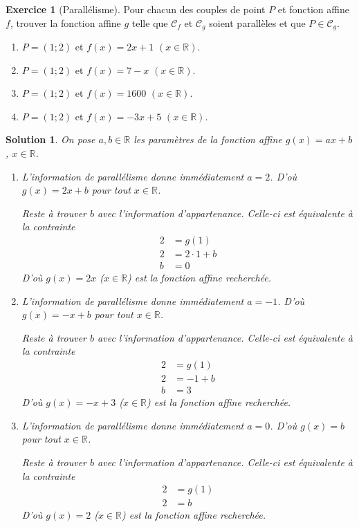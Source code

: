 \documentclass[12pt]{paper}
\theoremstyle{plain}
\newtheorem*{sol}{Solution}
\theoremstyle{definition}
\newtheorem{ex}{Exercice}
\newcommand{\C}{\mathcal{C}}
\newcommand{\R}{\mathbb{R}}
\newcommand{\exe}[2]{
		\begin{ex} #1  \end{ex}
		\begin{sol} #2 \end{sol}
	}
\newcommand{\exe}[2]{
		\begin{ex} #1  \end{ex}
	}
\begin{document}
\exe{[Parallélisme]
	Pour chacun des couples de point $P$ et fonction affine $f$, trouver la fonction affine $g$ telle que $\C_f$ et $\C_g$ soient parallèles et que $P \in \C_g$.
	
	
	\begin{multicols}{2}
	\begin{enumerate}
		\item $P=(1;2)$ et $f(x) = 2x+1$ $(x\in\R)$.
		\item $P=(1;2)$ et $f(x) = 7-x$ $(x\in\R)$.
		\item $P=(1;2)$ et $f(x) = 1600$ $(x\in\R)$.
		\item $P=(1;2)$ et $f(x) = -3x + 5$ $(x\in\R)$.
	\end{enumerate}
	\end{multicols}
}{
	On pose $a,b\in\R$ les paramètres de la fonction affine $g(x)=ax+b$, $x\in\R$.
	\begin{enumerate}
		\item 
			L'information de parallélisme donne immédiatement $a=2$.
			D'où $g(x) = 2x+b$ pour tout $x\in\R$.
			
			Reste à trouver $b$ avec l'information d'appartenance.
			Celle-ci est équivalente à la contrainte
				\begin{align*}
					2 &= g(1) \\
					2 &= 2\cdot1 + b \\
					b &= 0
				\end{align*}
			D'où $g(x) = 2x$ ($x\in\R$) est la fonction affine recherchée.
		
		
		\item 
			L'information de parallélisme donne immédiatement $a=-1$.
			D'où $g(x) = -x+b$ pour tout $x\in\R$.
			
			Reste à trouver $b$ avec l'information d'appartenance.
			Celle-ci est équivalente à la contrainte
				\begin{align*}
					2 &= g(1) \\
					2 &= -1 + b \\
					b &= 3
				\end{align*}
			D'où $g(x) = -x+3$ ($x\in\R$) est la fonction affine recherchée.
			
		\item 
			L'information de parallélisme donne immédiatement $a=0$.
			D'où $g(x) =b$ pour tout $x\in\R$.
			
			Reste à trouver $b$ avec l'information d'appartenance.
			Celle-ci est équivalente à la contrainte
				\begin{align*}
					2 &= g(1) \\
					2 &=  b
				\end{align*}
			D'où $g(x) = 2$ ($x\in\R$) est la fonction affine recherchée.
			

\end{enumerate}}
\end{document}
